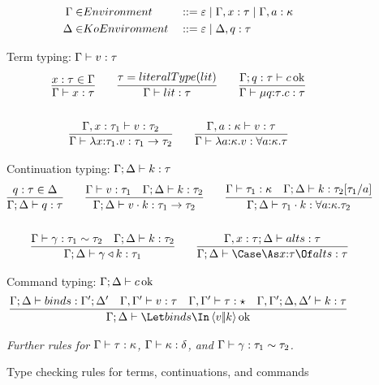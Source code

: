 \documentclass{article}
\begin{document}
\begin{figure}[h]
\centering
\begin{align*}
  \Gamma \in& Environment
  &
  &::= \varepsilon
  \mid \Gamma, x : \tau
  \mid \Gamma, a : \kappa
  \\
  \Delta \in& KoEnvironment
  &
  &::= \varepsilon
  \mid \Delta, q : \tau
\end{align*}

Term typing: $\Gamma \vdash v : \tau$
\begin{gather*}
  \infer
  {\Gamma \vdash x : \ty}
  {
    x:\ty \in \Gamma
  }
  \qquad
  \infer
  {\Gamma \vdash \lit : \ty}
  {\ty = literalType(\lit)}
  \qquad
  \infer
  {\Gamma \vdash \compute{\ann q \ty} \com : \ty}
  {
    \Gamma; q:\ty \vdash \com \Ok
  }
  \\\\
  \infer
  {\Gamma \vdash \fn{\ann x {\ty_1}} \tm : \ty_1 \to \ty_2}
  {
    \Gamma, x : \ty_1 \vdash \tm : \ty_2
  }
  \qquad
  \infer
  {\Gamma \vdash \fn{\ann a \ki} \tm : \forall \ann a \ki. \ty}
  {
    \Gamma, a:\ki \vdash \tm : \ty
  }
\end{gather*}

Continuation typing: $\Gamma; \Delta \vdash k : \tau$
\begin{gather*}
  \infer
  {\Gamma;\Delta \vdash q : \ty}
  {
    q : \ty \in \Delta
  }
  \qquad
  \infer
  {\Gamma;\Delta \vdash \app{\tm}{\ko} : \ty_1 \to \ty_2}
  {
    \Gamma \vdash \tm : \ty_1
    &
    \Gamma;\Delta \vdash \ko : \ty_2
  }
  \qquad
  \infer
  {\Gamma;\Delta \vdash \app{\ty_1}{\ko} : \forall \ann a \ki. \ty_2}
  {
    \Gamma \vdash \ty_1 : \ki
    &
    \Gamma;\Delta \vdash \ko : \ty_2[\ty_1/a]
  }
  \\\\
  \infer
  {\Gamma;\Delta \vdash \koerce{\cn}{\ko} : \ty_1}
  {
    \Gamma \vdash \cn : \eqty{\ty_1}{\ty_2}
    &
    \Gamma;\Delta \vdash \ko : \ty_2
  }
  \qquad
  \infer
  {\Gamma;\Delta \vdash \caseas{\ann x \ty}{\alts} : \ty}
  {
    \Gamma, x:\ty;\Delta \vdash \alts : \ty
  }
\end{gather*}

Command typing: $\Gamma; \Delta \vdash c \operatorname{ok}$
\begin{gather*}
  \infer
  {\Gamma;\Delta \vdash \mcut{\tm}{\ko}{\binds} \Ok}
  {
    \Gamma;\Delta \vdash \binds : \Gamma';\Delta'
    &
    \Gamma,\Gamma' \vdash \tm : \ty
    &
    \Gamma,\Gamma' \vdash \ty : \star
    &
    \Gamma,\Gamma'; \Delta,\Delta' \vdash \ko : \ty
  }
\end{gather*}

\emph{Further rules for $\Gamma \vdash \tau : \kappa$,
  $\Gamma \vdash \kappa : \delta$, and
  $\Gamma \vdash \gamma : \tau_1 \sim \tau_2$.}
\caption{Type checking rules for terms, continuations, and commands}
\label{fig:typing-rules}
\end{figure}
\end{document}
